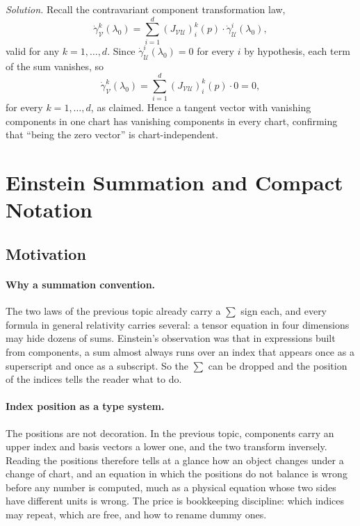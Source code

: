 \documentclass[11pt]{article}
\begin{document}
\medskip
\noindent\textit{Solution.} Recall the contravariant component
transformation law,
\[
\dot\gamma^k_{\mathcal V}(\lambda_0) = \sum_{i=1}^d(J_{\mathcal{VU}})^k_i(p)
\cdot\dot\gamma^i_{\mathcal U}(\lambda_0),
\]
valid for any $k=1,\dots,d$. Since $\dot\gamma^i_{\mathcal U}(\lambda_0)=0$
for every $i$ by hypothesis, each term of the sum vanishes, so
\[
\dot\gamma^k_{\mathcal V}(\lambda_0) = \sum_{i=1}^d(J_{\mathcal{VU}})^k_i(p)
\cdot 0 = 0,
\]
for every $k=1,\dots,d$, as claimed. Hence a tangent vector with vanishing
components in one chart has vanishing components in every chart,
confirming that ``being the zero vector'' is chart-independent.

\section{Einstein Summation and Compact Notation}

\subsection*{Motivation}

\paragraph{Why a summation convention.}
The two laws of the previous topic already carry a $\sum$ sign each, and every formula in general relativity carries several: a tensor equation in four dimensions may hide dozens of sums. Einstein's observation was that in expressions built from components, a sum almost always runs over an index that appears once as a superscript and once as a subscript. So the $\sum$ can be dropped and the position of the indices tells the reader what to do.

\paragraph{Index position as a type system.}
The positions are not decoration. In the previous topic, components carry an upper index and basis vectors a lower one, and the two transform inversely. Reading the positions therefore tells at a glance how an object changes under a change of chart, and an equation in which the positions do not balance is wrong before any number is computed, much as a physical equation whose two sides have different units is wrong. The price is bookkeeping discipline: which indices may repeat, which are free, and how to rename dummy ones.
\end{document}
